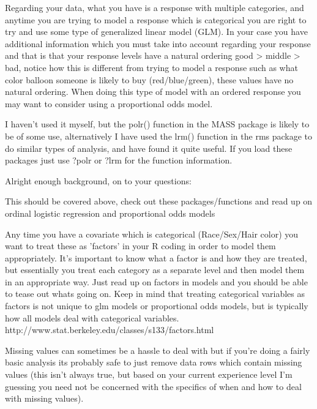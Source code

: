 \documentclass[00-GLMregslides.tex]{subfiles}
\begin{document}
\begin{frame}
Regarding your data, what you have is a response with multiple categories, and anytime you are trying to model a response which is categorical you are right to try and use some type of generalized linear model (GLM). In your case you have additional information which you must take into account regarding your response and that is that your response levels have a natural ordering good > middle > bad, notice how this is different from trying to model a response such as what color balloon someone is likely to buy (red/blue/green), these values have no natural ordering. When doing this type of model with an ordered response you may want to consider using a proportional odds model.

\end{frame}
\begin{frame}
I haven't used it myself, but the polr() function in the MASS package is likely to be of some use, alternatively I have used the lrm() function in the rms package to do similar types of analysis, and have found it quite useful. If you load these packages just use ?polr or ?lrm for the function information.
\end{frame}
\begin{frame}
Alright enough background, on to your questions:


This should be covered above, check out these packages/functions and read up on ordinal logistic regression and proportional odds models

Any time you have a covariate which is categorical (Race/Sex/Hair color) you want to treat these as 'factors' in your R coding in order to model them appropriately. It's important to know what a factor is and how they are treated, but essentially you treat each category as a separate level and then model them in an appropriate way. Just read up on factors in models and you should be able to tease out whats going on. Keep in mind that treating categorical variables as factors is not unique to glm models or proportional odds models, but is typically how all models deal with categorical variables. http://www.stat.berkeley.edu/classes/s133/factors.html
\end{frame}
\begin{frame}
Missing values can sometimes be a hassle to deal with but if you're doing a fairly basic analysis its probably safe to just remove data rows which contain missing values (this isn't always true, but based on your current experience level I'm guessing you need not be concerned with the specifics of when and how to deal with missing values). 
\end{frame}
\end{document}
